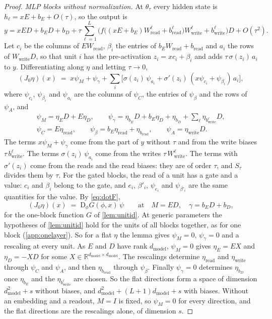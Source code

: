 \documentclass[10pt]{article}
\theoremstyle{definition}
\theoremstyle{remark}
\newcommand{\R}{\mathbb{R}}
\newcommand{\Wread}{W_{\mathrm{read}}}
\newcommand{\Wwrite}{W_{\mathrm{write}}}
\newcommand{\dm}{d_{\mathrm{model}}}
\newcommand{\Der}{\mathrm{D}}
\begin{document}
\begin{proof}
\emph{MLP blocks without normalization.} At $\theta_\tau$ every hidden state is $h_\ell = xE + b_E + O(\tau)$, so the output is
\[
y = xED + b_ED + b_D + \tau\sum_{\ell=1}^{L}\Big(f\big((xE + b_E)\Wread^{\ell} + b^{\ell}_{\mathrm{read}}\big)\Wwrite^{\ell} + b^{\ell}_{\mathrm{write}}\Big)D + O(\tau^2).
\]
Let $c_i$ be the columns of $E\Wread$, $\beta_i$ the entries of $b_E\Wread + b_{\mathrm{read}}$ and $a_i$ the rows of $\Wwrite D$, so that unit $i$ has the pre-activation $z_i = xc_i + \beta_i$ and adds $\tau\,\sigma(z_i)\,a_i$ to $y$. Differentiating along $\eta$ and letting $\tau \to 0$,
\[
(J_0\eta)(x) \;=\; x\psi_M + \psi_\gamma + \sum_i \big[\sigma(z_i)\,\psi_{a_i} + \sigma'(z_i)\,(x\psi_{c_i} + \psi_{\beta_i})\,a_i\big],
\]
where $\psi_{c_i}$, $\psi_{\beta_i}$ and $\psi_{a_i}$ are the columns of $\psi_C$, the entries of $\psi_\beta$ and the rows of $\psi_A$, and
\begin{gather*}
\psi_M = \eta_ED + E\eta_D,\qquad \psi_\gamma = \eta_{b_E}D + b_E\eta_D + \eta_{b_D} + \textstyle\sum_\ell \eta_{b^{\ell}_{\mathrm{write}}}D,\\
\psi_C = E\eta_{\mathrm{read}},\qquad \psi_\beta = b_E\eta_{\mathrm{read}} + \eta_{b_{\mathrm{read}}},\qquad \psi_A = \eta_{\mathrm{write}}D.
\end{gather*}
The terms $x\psi_M + \psi_\gamma$ come from the part of $y$ without $\tau$ and from the write biases $\tau\,b^{\ell}_{\mathrm{write}}$. The terms $\sigma(z_i)\,\psi_{a_i}$ come from the writes $\tau\,\Wwrite^{\ell}$. The terms with $\sigma'(z_i)$ come from the reads and the read biases: they are of order $\tau$, and $S_\tau$ divides them by $\tau$. For the gated blocks, the read of a unit has a gate and a value: $c_i$ and $\beta_i$ belong to the gate, and $e_i$, $\beta'_i$, $\psi_{e_i}$ and $\psi_{\beta'_i}$ are the same quantities for the value. By \eqref{eq:dotF},
\[
(J_0\eta)(x) \;=\; \Der_\phi G(\phi, x)\,\psi \qquad\text{at}\quad M = ED,\quad \gamma = b_ED + b_D,
\]
for the one-block function $G$ of \cref{lem:unitid}. At generic parameters the hypotheses of \cref{lem:unitid} hold for the units of all blocks together, as for one block (\cref{app:onelayer}). So for a flat $\eta$ the lemma gives $\psi_M = 0$, $\psi_\gamma = 0$ and a rescaling at every unit. As $E$ and $D$ have rank $\dm$, $\psi_M = 0$ gives $\eta_E = EX$ and $\eta_D = -XD$ for some $X \in \R^{\dm\times\dm}$. The rescalings determine $\eta_{\mathrm{read}}$ and $\eta_{\mathrm{write}}$ through $\psi_C$ and $\psi_A$, and then $\eta_{b_{\mathrm{read}}}$ through $\psi_\beta$. Finally $\psi_\gamma = 0$ determines $\eta_{b_D}$ once $\eta_{b_E}$ and the $\eta_{b^{\ell}_{\mathrm{write}}}$ are chosen. So the flat directions form a space of dimension $\dm^2 + s$ without biases, and $\dm^2 + (L+1)\dm + s$ with biases. Without an embedding and a readout, $M = I$ is fixed, so $\psi_M = 0$ for every direction, and the flat directions are the rescalings alone, of dimension $s$.


\end{proof}
\end{document}
